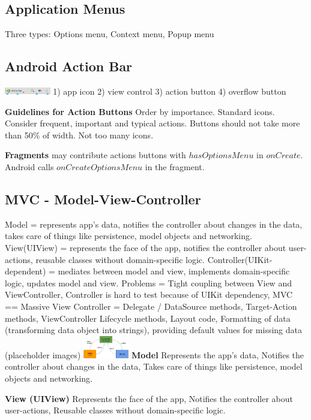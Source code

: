 \subsection{Application Menus}
Three types: Options menu, Context menu, Popup menu

\subsection{Android Action Bar}
\includegraphics[width=0.15\textwidth]{android/actionbar.png}
1) app icon
2) view control
3) action button
4) overflow button

\textbf{Guidelines for Action Buttons}
Order by importance. Standard icons. Consider frequent, important and typical
actions. Buttons should not take more than 50\% of width. Not too many icons.

\textbf{Fragments} may contribute actions buttons with $hasOptionsMenu$ in
$onCreate$. Android calls $onCreateOptionsMenu$ in the fragment.

\subsection{MVC -  Model-View-Controller}
Model = represents app's data, notifies the controller about changes in the data, takes care of things like persistence, model objects and networking. View(UIView) = represents the face of the app, notifies the controller about user-actions, reusable classes without domain-specific logic. Controller(UIKit-dependent) = mediates between model and view, implements domain-specific logic, updates model and view. Problems = Tight coupling between View and ViewController, Controller is hard to test because of UIKit dependency, MVC == Massive View Controller = Delegate / DataSource methods, Target-Action methods, ViewController Lifecycle methods, Layout code, Formatting of data (transforming data object into strings), providing default values for missing data (placeholder images)
\includegraphics[width=0.15\textwidth]{mvc.png}
\textbf{Model}
Represents the app's data,
Notifies the controller about changes in the data,
Takes care of things like persistence, model objects and networking.

\textbf{View (UIView)}
Represents the face of the app,
Notifies the controller about user-actions,
Reusable classes without domain-specific logic.

